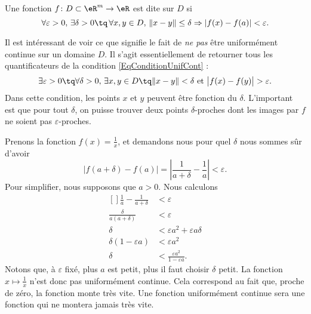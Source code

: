 \begin{definition}
	Une fonction $f\colon D\subset\eR^m\to \eR$ est dite  sur $D$ si
	\begin{equation}	\label{EqConditionUnifCont}
		\forall\varepsilon>0,\,\exists\delta>0\tq\,\forall x,y\in D,\,\| x-y \|\leq\delta \Rightarrow| f(x)-f(a) |<\varepsilon.
	\end{equation}
\end{definition}

Il est intéressant de voir ce que signifie le fait de \emph{ne pas} être uniformément continue sur un domaine $D$. Il s'agit essentiellement de retourner tous les quantificateurs de la condition \eqref{EqConditionUnifCont} :
\begin{equation}	\label{EqConditionPasUnifCont}
	\exists\varepsilon>0\tq\forall\delta>0,\,\exists x,y\in D\tq \| x-y \|<\delta\text{ et }\big| f(x)-f(y) \big|>\varepsilon.
\end{equation}
Dans cette condition, les points $x$ et $y$ peuvent être fonction du $\delta$. L'important est que pour tout $\delta$, on puisse trouver deux points $\delta$-proches dont les images par $f$ ne soient pas $\varepsilon$-proches.

\begin{example}
	Prenons la fonction $f(x)=\frac{1}{ x }$, et demandons nous pour quel $\delta$ nous sommes sûr d'avoir
	\begin{equation}
		| f(a+\delta)-f(a) |=\left| \frac{1}{ a+\delta }-\frac{1}{ a } \right| <\varepsilon.
	\end{equation}
	Pour simplifier, nous supposons que $a>0$. Nous calculons
	\begin{equation}
		\begin{aligned}[]
			\frac{ 1 }{ a }-\frac{1}{ a+\delta }&<	\varepsilon\\
			\frac{ \delta }{ a(a+\delta) }&<\varepsilon\\
			\delta&<\varepsilon a^2+\varepsilon a\delta\\
			\delta(1-\varepsilon a)&<\varepsilon a^2\\
			\delta&<\frac{ \varepsilon a^2 }{ 1-\varepsilon a }.
		\end{aligned}
	\end{equation}
	Notons que, à $\varepsilon$ fixé, plus $a$ est petit, plus il faut choisir $\delta$ petit. La fonction $x\mapsto\frac{1}{ x }$ n'est donc pas uniformément continue. Cela correspond au fait que, proche de zéro, la fonction monte très vite. Une fonction uniformément continue sera une fonction qui ne montera jamais très vite.
\end{example}

